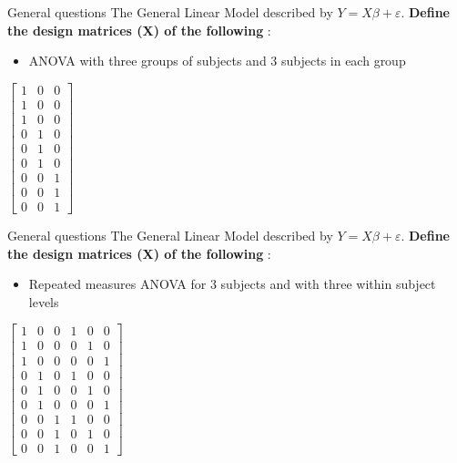 \documentclass{beamer}
\begin{document}
\begin{frame}{General questions} 
The General Linear Model described by $Y=X\beta+\varepsilon$. \textbf{Define the design matrices (X) of the following} :
  
      \begin{itemize}
	\item ANOVA with three groups of subjects and 3 subjects in each group
      \end{itemize}
	
      \begin{center}
      $
      \left[
      \begin{array}{ccc}
      1 & 0 & 0\\
      1 & 0 & 0\\
      1 & 0 & 0\\
      0 & 1 & 0\\
      0 & 1 & 0\\
      0 & 1 & 0\\
      0 & 0 & 1\\
      0 & 0 & 1\\
      0 & 0 & 1
      \end{array}
      \right]
      $
      \end{center}
\end{frame}


\begin{frame}{General questions}
The General Linear Model described by $Y=X\beta+\varepsilon$. \textbf{Define the design matrices (X) of the following} :
  
      \begin{itemize}
	\item Repeated measures ANOVA for 3 subjects and with three within subject levels
      \end{itemize}
	
      \begin{center}
      $
      \left[
      \begin{array}{cccccc}
      1 & 0 & 0 & 1 & 0 & 0\\
      1 & 0 & 0 & 0 & 1 & 0\\
      1 & 0 & 0 & 0 & 0 & 1\\
      0 & 1 & 0 & 1 & 0 & 0\\
      0 & 1 & 0 & 0 & 1 & 0\\
      0 & 1 & 0 & 0 & 0 & 1\\
      0 & 0 & 1 & 1 & 0 & 0\\
      0 & 0 & 1 & 0 & 1 & 0\\
      0 & 0 & 1 & 0 & 0 & 1
      \end{array}
      \right]
      $
      \end{center}
\end{frame}
\end{document}
